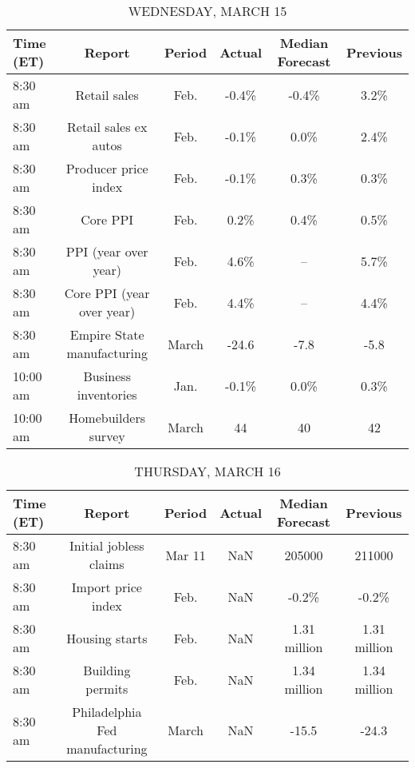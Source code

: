\documentclass{article}%
\begin{document}
\begin{table}[htbp]%
\caption{WEDNESDAY, MARCH 15}%
\centering%
\begin{adjustbox}{width=1\textwidth}%
\begin{tabular}{lccccc}
\toprule
Time (ET) &                     Report & Period & Actual & Median Forecast & Previous \\
\midrule
  8:30 am &               Retail sales &   Feb. &  -0.4\% &           -0.4\% &     3.2\% \\
  8:30 am &      Retail sales ex autos &   Feb. &  -0.1\% &            0.0\% &     2.4\% \\
  8:30 am &       Producer price index &   Feb. &  -0.1\% &            0.3\% &     0.3\% \\
  8:30 am &                   Core PPI &   Feb. &   0.2\% &            0.4\% &     0.5\% \\
  8:30 am &       PPI (year over year) &   Feb. &   4.6\% &              -- &     5.7\% \\
  8:30 am &  Core PPI (year over year) &   Feb. &   4.4\% &              -- &     4.4\% \\
  8:30 am & Empire State manufacturing &  March &  -24.6 &            -7.8 &     -5.8 \\
 10:00 am &       Business inventories &   Jan. &  -0.1\% &            0.0\% &     0.3\% \\
 10:00 am &        Homebuilders survey &  March &     44 &              40 &       42 \\
\bottomrule
\end{tabular}
%
\end{adjustbox}%
\end{table}

%


\begin{table}[htbp]%
\caption{THURSDAY, MARCH 16}%
\centering%
\begin{adjustbox}{width=1\textwidth}%
\begin{tabular}{lccccc}
\toprule
Time (ET) &                         Report & Period & Actual & Median Forecast &     Previous \\
\midrule
  8:30 am &         Initial jobless claims & Mar 11 &    NaN &          205000 &       211000 \\
  8:30 am &             Import price index &   Feb. &    NaN &           -0.2\% &        -0.2\% \\
  8:30 am &                 Housing starts &   Feb. &    NaN &    1.31 million & 1.31 million \\
  8:30 am &               Building permits &   Feb. &    NaN &    1.34 million & 1.34 million \\
  8:30 am & Philadelphia Fed manufacturing &  March &    NaN &           -15.5 &        -24.3 \\
\bottomrule
\end{tabular}
%
\end{adjustbox}%
\end{table}
\end{document}

